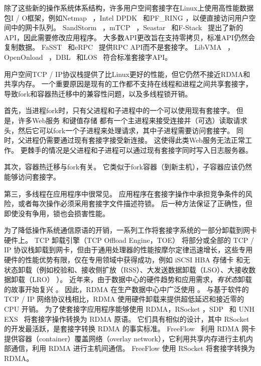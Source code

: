 除了这些新的操作系统体系结构，许多用户空间套接字在Linux上使用高性能数据包I / O框架，例如Netmap~ \cite {rizzo2012netmap}，Intel DPDK~ \cite {dpdk}和PF\_RING \cite {pf-ring}，以便直接访问用户空间中的网卡队列。
SandStorm~ \cite {marinos2014network}，mTCP~ \cite {jeong2014mtcp}，Seastar~ \cite {seastar}和F-Stack~ \cite {fstack}提出了新的API，因此需要修改应用程序。
大多数API更改旨在支持零拷贝，标准API仍然会复制数据。
FaSST~ \cite {kalia2016fasst}和eRPC~ \cite {kalia2018datacenter}提供RPC API而不是套接字。
LibVMA~ \cite {libvma}，OpenOnload~ \cite {openonload}，DBL~ \cite {dbl}和LOS~ \cite {huang2017high}符合标准套接字API。

用户空间TCP / IP协议栈提供了比Linux更好的性能，但它仍然不接近RDMA和共享内存。
一个重要原因是现有的工作都不支持在线程和进程之间共享套接字，导致fork和容器热迁移中的兼容性问题，以及多线程锁开销。

首先，当进程fork时，只有父进程和子进程中的一个可以使用现有套接字。
但是，许多Web服务 \cite {apache,nginx,php-fpm,python-gunicorn,vsftpd}和键值存储 \cite {memcached}都有一个主进程来接受连接并（可选）读取请求头，然后它可以fork一个子进程来处理请求，其中子进程需要访问套接字。
同时，父进程仍需要通过现有套接字接受新连接。
这使得此类Web服务无法正常工作。
更棘手的情况是父进程和子进程可以通过现有套接字同时写入日志服务器。

其次，容器热迁移与fork有关。
它类似于fork容器（到新主机），子容器应该仍然能够访问套接字。

第三，多线程在应用程序中很常见。
应用程序在套接字操作中承担竞争条件的风险，或者每次操作必须采用套接字文件描述符锁。
后一种方法保证了正确性，但即使没有争用，锁也会损害性能。

为了降低操作系统通信原语的开销，一系列工作将套接字系统的一部分卸载到网卡硬件上。
TCP 卸载引擎（TCP Offload Engine，TOE） \cite {tcp-chimney-offload} 将部分或全部的 TCP / IP 协议栈卸载到网卡，但由于通用处理器的性能按摩尔定律迅速增长，这些专用硬件的性能优势有限，仅在专用领域中获得成功，例如 iSCSI HBA 存储卡 \cite {iscsi-hba} 和无状态卸载（例如校验和、接收侧扩放（RSS）、大发送数据卸载（LSO）、大接收数据卸载（LRO） \cite {lsolro}）。
近年来，由于数据中心的硬件趋势和应用需求，\emph {有状态}卸载的故事开始复兴 \cite {chuanxiong-rdma-keynote}。
因此，RDMA \cite {infiniband2000infiniband} 在生产数据中心中广泛使用 \cite {guo2016rdma}。
与基于软件的 TCP / IP 网络协议栈相比，RDMA 使用硬件卸载来提供超低延迟和接近零的 CPU 开销。
为了使套接字应用程序能够使用 RDMA，RSocket \cite {rsockets}，SDP~ \cite {socketsdirect} 和 UNH EXS~ \cite {russell2008extended} 将套接字操作转换为 RDMA 原语。
它们具有相似的设计，其中 RSocket 的开发最活跃，是套接字转换 RDMA 的事实标准。
FreeFlow~ \cite {nsdi19freeflow} 利用 RDMA 网卡提供容器（container）覆盖网络（overlay network），它利用共享内存进行主机内部通信，利用 RDMA 进行主机间通信。
FreeFlow 使用 RSocket 将套接字转换为 RDMA。

